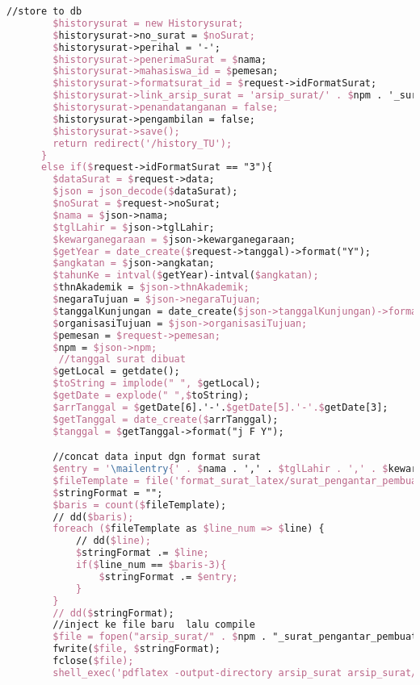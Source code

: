 \begin{lstlisting}[language=tex,basicstyle=\tiny,caption=HistorysuratController.php]
        //store to db
        $historysurat = new Historysurat;
        $historysurat->no_surat = $noSurat;
        $historysurat->perihal = '-';
        $historysurat->penerimaSurat = $nama;
        $historysurat->mahasiswa_id = $pemesan;
        $historysurat->formatsurat_id = $request->idFormatSurat;
        $historysurat->link_arsip_surat = 'arsip_surat/' . $npm . '_surat_keterangan_mahasiswa_aktif.pdf';
        $historysurat->penandatanganan = false;
        $historysurat->pengambilan = false;
        $historysurat->save();
        return redirect('/history_TU');
      }
      else if($request->idFormatSurat == "3"){
        $dataSurat = $request->data;
        $json = json_decode($dataSurat);
        $noSurat = $request->noSurat;
        $nama = $json->nama;
        $tglLahir = $json->tglLahir;
        $kewarganegaraan = $json->kewarganegaraan;
        $getYear = date_create($request->tanggal)->format("Y");
        $angkatan = $json->angkatan; 
        $tahunKe = intval($getYear)-intval($angkatan);
        $thnAkademik = $json->thnAkademik;
        $negaraTujuan = $json->negaraTujuan;
        $tanggalKunjungan = date_create($json->tanggalKunjungan)->format("j F Y");
        $organisasiTujuan = $json->organisasiTujuan;
        $pemesan = $request->pemesan;
        $npm = $json->npm;
         //tanggal surat dibuat
        $getLocal = getdate();
        $toString = implode(" ", $getLocal);
        $getDate = explode(" ",$toString);
        $arrTanggal = $getDate[6].'-'.$getDate[5].'-'.$getDate[3];
        $getTanggal = date_create($arrTanggal);
        $tanggal = $getTanggal->format("j F Y");

        //concat data input dgn format surat
        $entry = '\mailentry{' . $nama . ',' . $tglLahir . ',' . $kewarganegaraan  . ',' . $tahunKe . ',' . $thnAkademik . ',' . $negaraTujuan . ',' . $tanggalKunjungan . ',' . $organisasiTujuan . ',' . $tanggal . '}';
        $fileTemplate = file('format_surat_latex/surat_pengantar_pembuatan_visa.tex');
        $stringFormat = "";
        $baris = count($fileTemplate);
        // dd($baris);
        foreach ($fileTemplate as $line_num => $line) {
            // dd($line);
            $stringFormat .= $line;
            if($line_num == $baris-3){
                $stringFormat .= $entry;
            }
        }
        // dd($stringFormat);
        //inject ke file baru  lalu compile
        $file = fopen("arsip_surat/" . $npm . "_surat_pengantar_pembuatan_visa.tex", "w");
        fwrite($file, $stringFormat);
        fclose($file);
        shell_exec('pdflatex -output-directory arsip_surat arsip_surat/' . $npm . '_surat_pengantar_pembuatan_visa.tex');


\end{lstlisting}
